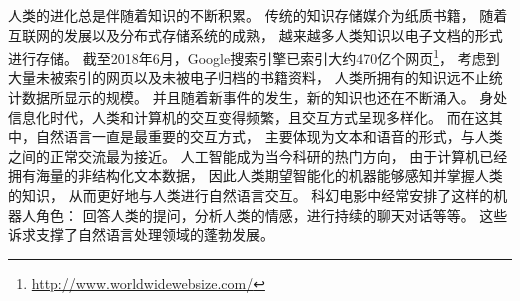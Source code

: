 % 
% 
% 
% 
% 

人类的进化总是伴随着知识的不断积累。
传统的知识存储媒介为纸质书籍，
随着互联网的发展以及分布式存储系统的成熟，
越来越多人类知识以电子文档的形式进行存储。
截至2018年6月，Google搜索引擎已索引大约470亿个网页\footnote{\url{http://www.worldwidewebsize.com/}}，
考虑到大量未被索引的网页以及未被电子归档的书籍资料，
人类所拥有的知识远不止统计数据所显示的规模。
并且随着新事件的发生，新的知识也还在不断涌入。
身处信息化时代，人类和计算机的交互变得频繁，且交互方式呈现多样化。
而在这其中，自然语言一直是最重要的交互方式，
主要体现为文本和语音的形式，与人类之间的正常交流最为接近。
人工智能成为当今科研的热门方向，
由于计算机已经拥有海量的非结构化文本数据，
因此人类期望智能化的机器能够感知并掌握人类的知识，
从而更好地与人类进行自然语言交互。
科幻电影中经常安排了这样的机器人角色：
回答人类的提问，分析人类的情感，进行持续的聊天对话等等。
这些诉求支撑了自然语言处理领域的蓬勃发展。


